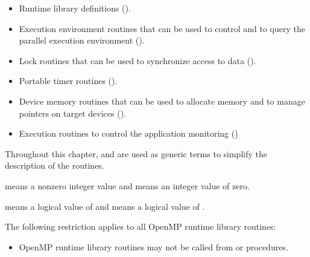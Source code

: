 \begin{itemize}
\item Runtime library definitions 
().

\item Execution environment routines that can be used to control and to query the parallel 
execution environment 
().

\item Lock routines that can be used to synchronize access to data 
(). 

\item Portable timer routines 
().

\item Device memory routines that can be used to allocate memory and 
to manage pointers on target devices ().



\item Execution routines to control the application monitoring
()
\end{itemize}

Throughout this chapter,  and  are used as generic terms to simplify the 
description of the routines. 

\begin{samepage}
\ccppspecificstart
{} means a nonzero integer value and  means an integer value of zero. 
\ccppspecificend
\end{samepage}
\bigskip

\begin{samepage}
\fortranspecificstart
{} means a logical value of  and  means a logical value of .
\fortranspecificend
\end{samepage}
\bigskip

\begin{samepage}
\vspace{1\baselineskip}
\fortranspecificstart
\vspace{-1\baselineskip}
\restrictions

The following restriction applies to all OpenMP runtime library routines:

\begin{itemize}
\item OpenMP runtime library routines may not be called from  or  
procedures. 
\end{itemize}
\fortranspecificend
\end{samepage}











